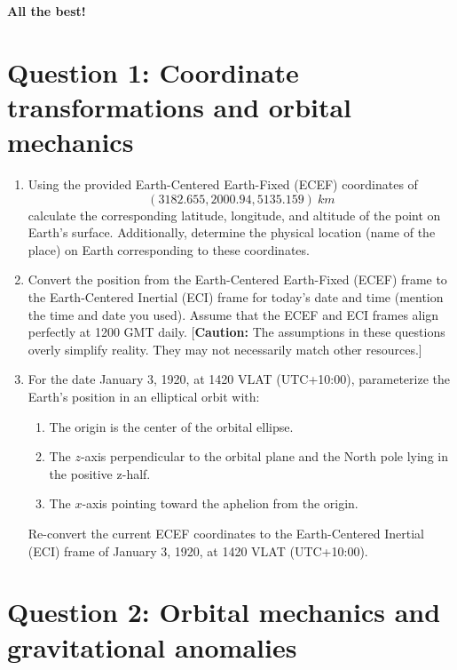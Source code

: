 \documentclass[a4paper, 12pt]{exam}
\begin{document}
	\begin{center}
		\textbf{All the best!}
	\end{center}
		
	\pagebreak
	
	

\section*{Question 1: Coordinate transformations and orbital mechanics}

\begin{enumerate}[label = (\alph*)]
	\item Using the provided Earth-Centered Earth-Fixed (ECEF) coordinates of \[(3182.655, 2000.94, 5135.159) \ km\] calculate the corresponding latitude, longitude, and altitude of the point on Earth's surface. Additionally, determine the physical location (name of the place) on Earth corresponding to these coordinates.
	\item Convert the position from the Earth-Centered Earth-Fixed (ECEF) frame to the Earth-Centered Inertial (ECI) frame for today's date and time (mention the time and date you used). Assume that the ECEF and ECI frames align perfectly at 1200 GMT daily. [\textbf{Caution:} The assumptions in these questions overly simplify reality. They may not necessarily match other resources.]
	\item For the date January 3, 1920, at 1420 VLAT (UTC+10:00), parameterize the Earth's position in an elliptical orbit with:
	\begin{enumerate}[label = (\roman*)]
		\item The origin is the center of the orbital ellipse.
		\item The \( z \)-axis perpendicular to the orbital plane and the North pole lying in the positive z-half.
		\item The \( x \)-axis pointing toward the aphelion from the origin.
	\end{enumerate}
	Re-convert the current ECEF coordinates to the Earth-Centered Inertial (ECI) frame of January 3, 1920, at 1420 VLAT (UTC+10:00).
\end{enumerate}

	\pagebreak

\section*{Question 2: Orbital mechanics and gravitational anomalies}
\end{document}
